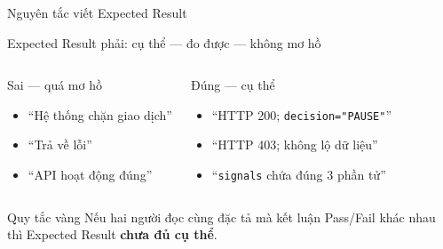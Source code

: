 \documentclass[aspectratio=169,12pt]{beamer}
\begin{document}
\begin{frame}{Nguyên tắc viết Expected Result}
  \begin{block}{Expected Result phải: cụ thể --- đo được --- không mơ hồ}
  \end{block}

  \begin{columns}[T]
    \begin{alertblock}{Sai --- quá mơ hồ}
      \begin{itemize}
        \item ``Hệ thống chặn giao dịch''
        \item ``Trả về lỗi''
        \item ``API hoạt động đúng''
      \end{itemize}
    \end{alertblock}

    \begin{exampleblock}{Đúng --- cụ thể}
      \begin{itemize}
        \item ``HTTP 200; \texttt{decision="PAUSE"}''
        \item ``HTTP 403; không lộ dữ liệu''
        \item ``\texttt{signals} chứa đúng 3 phần tử''
      \end{itemize}
    \end{exampleblock}
  \end{columns}

  \vspace{0.3em}
  \begin{alertblock}{Quy tắc vàng}
    Nếu hai người đọc cùng đặc tả mà kết luận Pass/Fail khác nhau
    thì Expected Result \textbf{chưa đủ cụ thể}.
  \end{alertblock}
\end{frame}
\end{document}
